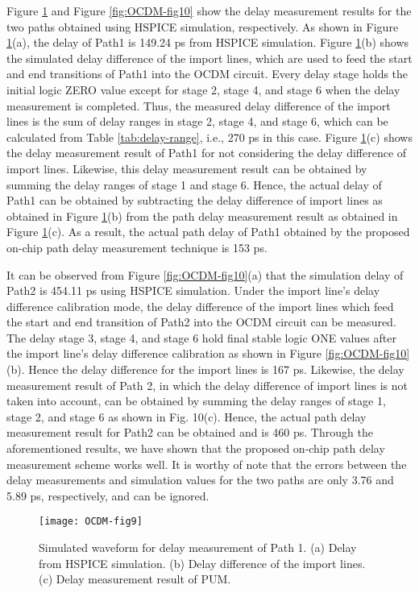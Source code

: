 Figure \ref{fig:OCDM-fig9} and Figure \ref{fig:OCDM-fig10} show the delay measurement results for the two paths obtained using HSPICE simulation, respectively. As shown in Figure \ref{fig:OCDM-fig9}(a), the delay of Path1 is 149.24 ps from HSPICE simulation. Figure \ref{fig:OCDM-fig9}(b) shows the simulated delay difference of the import lines, which are used to feed the start and end transitions of Path1 into the OCDM circuit. Every delay stage holds the initial logic ZERO value except for stage 2, stage 4, and stage 6 when the delay measurement is completed. Thus, the measured delay difference of the import lines is the sum of delay ranges in stage 2, stage 4, and stage 6, which can be calculated from Table \ref{tab:delay-range}, i.e., 270 ps in this case. Figure \ref{fig:OCDM-fig9}(c) shows the delay measurement result of Path1 for not considering the delay difference of import lines. Likewise, this delay measurement result can be obtained by summing the delay ranges of stage 1 and stage 6. Hence, the actual delay of Path1 can be obtained by subtracting the delay difference of import lines as obtained in Figure \ref{fig:OCDM-fig9}(b) from the path delay measurement result as obtained in Figure \ref{fig:OCDM-fig9}(c). As a result, the actual path delay of Path1 obtained by the proposed on-chip path delay measurement technique is 153 ps.

It can be observed from Figure \ref{fig:OCDM-fig10}(a) that the simulation delay of Path2 is 454.11 ps using HSPICE simulation. Under the import line’s delay difference calibration mode, the delay difference of the import lines which feed the start and end transition of Path2 into the OCDM circuit can be measured. The delay stage 3, stage 4, and stage 6 hold final stable logic ONE values after the import line’s delay difference calibration as shown in Figure \ref{fig:OCDM-fig10}(b). Hence the delay difference for the import lines is 167 ps. Likewise, the delay measurement result of Path 2, in which the delay difference of import lines is not taken into account, can be obtained by summing the delay ranges of stage 1, stage 2, and stage 6 as shown in Fig. 10(c). Hence, the actual path delay measurement result for Path2 can be obtained and is 460 ps. Through the aforementioned results, we have shown that the proposed on-chip path delay measurement scheme works well. It is worthy of note that the errors between the delay measurements and simulation values for the two paths are only 3.76 and 5.89 ps, respectively, and can be ignored.
\begin{figure}[t]
\centering
\texttt{[image: OCDM-fig9]}
    \caption{Simulated waveform for delay measurement of Path 1. (a) Delay from HSPICE simulation. (b) Delay difference of the import lines. (c) Delay measurement result of PUM.}
    \label{fig:OCDM-fig9}
\end{figure}

